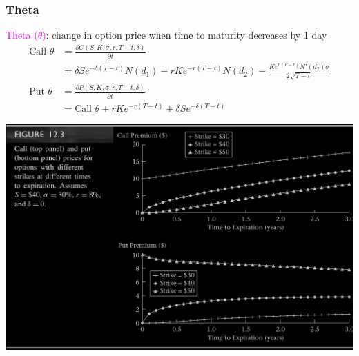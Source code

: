 \begin{frame}[fragile]
	\frametitle{Theta}
	\centering

	\textcolor{magenta}{Theta ($\theta$)}: change in option price when time to maturity decreases by 1 day
	\bigskip
	\begin{align*}
		\text{Call $\theta$} & = \frac{\partial C(S,K,\sigma,r,T-t,\delta)}{\partial t}                                              \\
                         & = \delta S e^{-\delta(T-t)}N(d_1)-r K e^{-r(T-t)}N(d_2)- \frac{Ke^{r(T-r)}N'(d_2)\sigma}{2\sqrt{T-t}} \\[1em]
		\text{Put $\theta$}  & = \frac{\partial P(S,K,\sigma,r,T-t,\delta)}{\partial t}                                              \\
                         & = \text{Call $\theta$} + rK e^{-r(T-t)} + \delta S e^{-\delta(T-t)}
	\end{align*}

\end{frame}
\begin{frame}[fragile]
\begin{center}
	\includegraphics[scale=0.2]{figs/Figure-12-3.png}
\end{center}
\end{frame}
